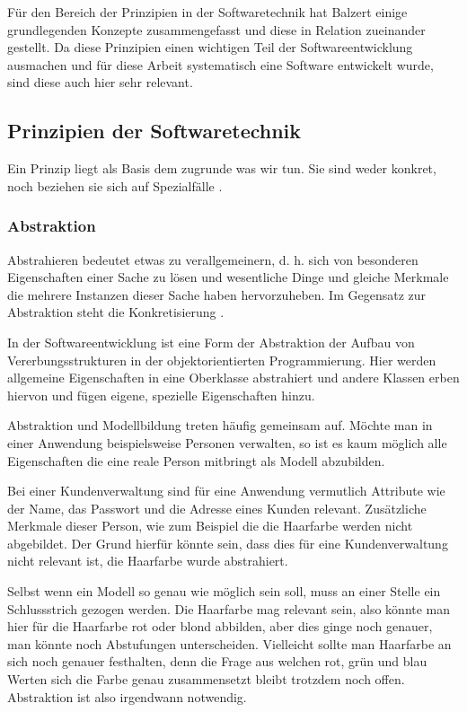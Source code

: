 \documentclass[12pt,oneside,a4paper,parskip]{scrbook}
\begin{document}
Für den Bereich der Prinzipien in der Softwaretechnik hat Balzert einige grundlegenden Konzepte zusammengefasst und diese in Relation zueinander gestellt. Da diese Prinzipien einen wichtigen Teil der Softwareentwicklung ausmachen und für diese Arbeit systematisch eine Software entwickelt wurde, sind diese auch hier sehr relevant.

\subsection{Prinzipien der Softwaretechnik}

Ein Prinzip liegt als Basis dem zugrunde was wir tun. Sie sind weder konkret, noch beziehen sie sich auf Spezialfälle \cite[S. 25]{balzert2009a}. 

\subsubsection{Abstraktion}

Abstrahieren bedeutet etwas zu verallgemeinern, d. h. sich von besonderen Eigenschaften einer Sache zu lösen und wesentliche Dinge und gleiche Merkmale die mehrere Instanzen dieser Sache haben hervorzuheben. Im Gegensatz zur Abstraktion steht die Konkretisierung \cite[S. 26]{balzert2009a}.

In der Softwareentwicklung ist eine Form der Abstraktion der Aufbau von Vererbungsstrukturen in der objektorientierten Programmierung. Hier werden allgemeine Eigenschaften in eine Oberklasse abstrahiert und andere Klassen erben hiervon und fügen eigene, spezielle Eigenschaften hinzu.

Abstraktion und Modellbildung treten häufig gemeinsam auf. Möchte man in einer Anwendung beispielsweise Personen verwalten, so ist es kaum möglich alle Eigenschaften die eine reale Person mitbringt als Modell abzubilden. 

Bei einer Kundenverwaltung sind für eine Anwendung vermutlich Attribute wie der Name, das Passwort und die Adresse eines Kunden relevant. Zusätzliche Merkmale dieser Person, wie zum Beispiel die die Haarfarbe werden nicht abgebildet. Der Grund hierfür könnte sein, dass dies für eine Kundenverwaltung nicht relevant ist, die Haarfarbe wurde abstrahiert.

Selbst wenn ein Modell so genau wie möglich sein soll, muss an einer Stelle ein Schlussstrich gezogen werden. Die Haarfarbe mag relevant sein, also könnte man hier für die Haarfarbe rot oder blond abbilden, aber dies ginge noch genauer, man könnte noch Abstufungen unterscheiden. Vielleicht sollte man Haarfarbe an sich noch genauer festhalten, denn die Frage aus welchen rot, grün und blau Werten sich die Farbe genau zusammensetzt bleibt trotzdem noch offen. Abstraktion ist also irgendwann notwendig.
\end{document}
